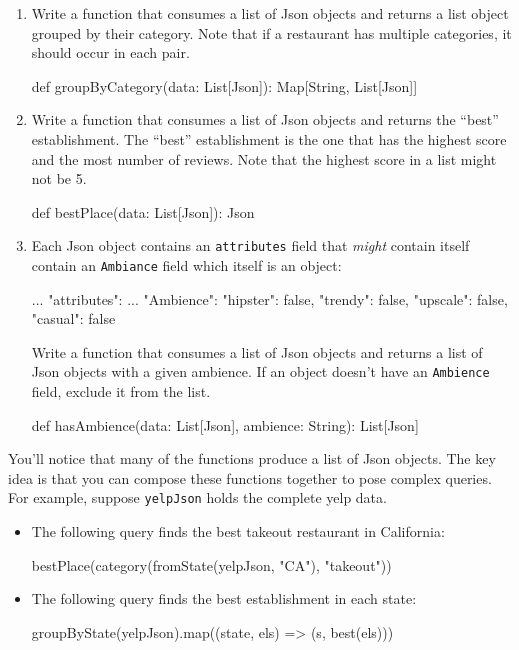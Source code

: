 \begin{enumerate}
    \item Write a function that consumes a list of Json objects and returns
    a list object grouped by their category. Note that if a restaurant has
    multiple categories, it should occur in each pair.
    \begin{scalacode}
    def groupByCategory(data: List[Json]): Map[String, List[Json]]
    \end{scalacode}

    \item Write a function that consumes a list of Json objects and returns
    the ``best'' establishment. The ``best'' establishment is the one that
    has the highest score and the most number of reviews. Note that the
    highest score in a list might not be 5.
    \begin{scalacode}
    def bestPlace(data: List[Json]): Json
    \end{scalacode}

    \item Each Json object contains an \texttt{attributes} field that
    \textit{might} contain itself contain an \texttt{Ambiance} field which
    itself is an object:
    \begin{scalacode}
    {   ...
        "attributes": {
            ...
            "Ambience": {
                "hipster": false,
                "trendy": false,
                "upscale": false,
                "casual": false
            }
        }
    }
    \end{scalacode}
    Write a function that consumes a list of Json objects and returns a list
    of Json objects with a given ambience. If an object doesn't have an
    \texttt{Ambience} field, exclude it from the list.
    \begin{scalacode}
    def hasAmbience(data: List[Json], ambience: String): List[Json]
    \end{scalacode}

\end{enumerate}

\noindent You'll notice that many of the functions produce a list of Json
objects. The key idea is that you can compose these functions together to
pose complex queries. For example, suppose \texttt{yelpJson} holds the
complete yelp data.

\begin{itemize}
\item The following query finds the best takeout restaurant in California:
    \begin{scalacode}
    bestPlace(category(fromState(yelpJson, "CA"), "takeout"))
    \end{scalacode}

\item The following query finds the best establishment in each state:
    \begin{scalacode}
    groupByState(yelpJson).map((state, els) => (s, best(els)))
    \end{scalacode}
\end{itemize}



